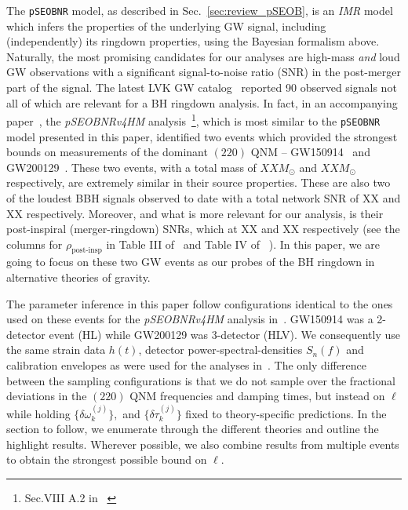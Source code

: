 \documentclass[twocolumn,prd,aps,superscriptaddress,preprintnumbers,tightenlines,showpacs,nofootinbib,eqsecnum,amsfonts,amsmath,longbibliography]{revtex4-1}
\newcommand{\Mo}{M_{\odot}}
\newcommand{\pSEOB}{\texttt{pSEOBNR}}
\begin{document}
The \pSEOB{} model, as described in Sec.~\ref{sec:review_pSEOB}, is an \emph{IMR} model which infers the properties of the underlying GW signal, including (independently) its ringdown properties, using the Bayesian formalism above. Naturally, the most promising candidates for our analyses are high-mass \emph{and} loud GW observations with a significant signal-to-noise ratio (SNR) in the post-merger part of the signal. The latest LVK GW catalog~\cite{LIGOScientific:2021djp} reported 90 observed signals not all of which are relevant for a BH ringdown analysis. In fact, in an accompanying paper~\cite{LIGOScientific:2021sio}, the \textit{pSEOBNRv4HM} analysis~\footnote{Sec.VIII A.2 in ~\cite{LIGOScientific:2021sio}}, which is most similar to the \pSEOB{} model presented in this paper, identified two events which provided the strongest bounds on measurements of the dominant $(220)$ QNM -- GW150914~\cite{LIGOScientific:2016aoc} and GW200129~\cite{LIGOScientific:2021djp}. These two events, with a total mass of $XX \Mo$ and $XX \Mo$ respectively, are extremely similar in their source properties. These are also two of the loudest BBH signals observed to date with a total network SNR of XX and XX respectively. Moreover, and what is more relevant for our analysis, is their post-inspiral (merger-ringdown) SNRs, which at XX and XX respectively (see the columns for $\rho_{\text{post-insp}}$ in Table III of~\cite{LIGOScientific:2019fpa} and Table IV of ~\cite{LIGOScientific:2021sio}). In this paper, we are going to focus on these two GW events as our probes of the BH ringdown in alternative theories of gravity.

The parameter inference in this paper follow configurations identical to the ones used on these events for the \textit{pSEOBNRv4HM} analysis in~\cite{LIGOScientific:2021sio}. GW150914 was a 2-detector event (HL) while GW200129 was 3-detector (HLV). We consequently use the same strain data $h(t)$, detector power-spectral-densities $S_n(f)$ and calibration envelopes as were used for the analyses in~\cite{LIGOScientific:2021sio}. The only difference between the sampling configurations is that we do not sample over the fractional deviations in the $(220)$ QNM frequencies and damping times, but instead on $\ell$ while holding $\{\delta \omega_k^{(j)}\},$ and $\{\delta \tau_k^{(j)}\}$ fixed to theory-specific predictions. In the section to follow, we enumerate through the different theories and outline the highlight results. Wherever possible, we also combine results from multiple events to obtain the strongest possible bound on $\ell$.
\end{document}
